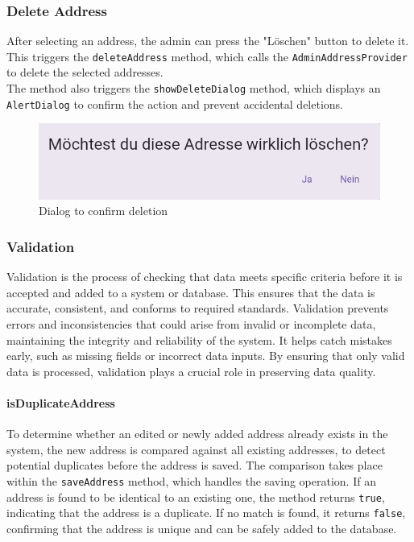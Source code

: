 \subsubsection{Delete Address}
After selecting an address, the admin can press the "Löschen" button to delete it. This triggers the \texttt{deleteAddress} method, which calls the \texttt{AdminAddressProvider} to delete the selected addresses.\\

The method also triggers the \texttt{showDeleteDialog} method, which displays an \texttt{AlertDialog} to confirm the action and prevent accidental deletions.

\begin{figure}[H]
    \centering
    \includegraphics[width=0.6\linewidth]{images/AdminPanel/DeleteDialog.png}
    \caption{Dialog to confirm deletion}
\end{figure}
\newpage

\subsubsection{Validation}
\label{fig:Validation}
    Validation is the process of checking that data meets specific criteria before it is accepted and added to a system or database. This ensures that the data is accurate, consistent, and conforms to required standards. Validation prevents errors and inconsistencies that could arise from invalid or incomplete data, maintaining the integrity and reliability of the system. It helps catch mistakes early, such as missing fields or incorrect data inputs. By ensuring that only valid data is processed, validation plays a crucial role in preserving data quality. \autocite{ContributorstoWikimediaprojects2025Feb}

\paragraph{isDuplicateAddress}
    To determine whether an edited or newly added address already exists in the system, the new address is compared against all existing addresses, to detect potential duplicates before the address is saved. The comparison takes place within the \texttt{saveAddress} method, which handles the saving operation. If an address is found to be identical to an existing one, the method returns \texttt{true}, indicating that the address is a duplicate. If no match is found, it returns \texttt{false}, confirming that the address is unique and can be safely added to the database.\\

